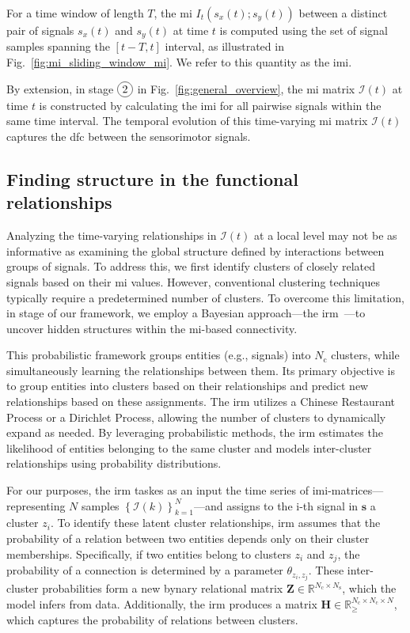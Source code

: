 For a time window of length $T$, the \ac{mi} $I_t(s_x(t);s_y(t))$ between a distinct pair of signals $s_x(t)$ and $s_y(t)$ at time $t$ is computed using the set of signal samples spanning the $\left[t-T,t\right]$ interval, as illustrated in Fig.~\ref{fig:mi_sliding_window_mi}. We refer to this quantity as the \acf{imi}. 

By extension, in stage $\circled{2}$ in Fig.~\ref{fig:general_overview}, the \ac{mi} matrix $\bm{\mathcal{I}}(t)$ at time $t$ is constructed by calculating the \ac{imi} for all pairwise signals within the same time interval. The temporal evolution of this time-varying \ac{mi} matrix $\bm{\mathcal{I}}(t)$ captures the \ac{dfc} between the sensorimotor signals.

\subsection{Finding structure in the functional relationships}\label{sec:the_irm}
Analyzing the time-varying relationships in $\bm{\mathcal{I}}(t)$ at a local level may not be as informative as examining the global structure defined by interactions between groups of signals. To address this, we first identify clusters of closely related signals based on their \ac{mi} values. However, conventional clustering techniques typically require a predetermined number of clusters. To overcome this limitation, in stage  of our framework, we employ a Bayesian approach---the \ac{irm}~\cite{Moerup2012}---to uncover hidden structures within the \ac{mi}-based connectivity.

This probabilistic framework groups entities (e.g., signals) into $N_\text{c}$ clusters, while simultaneously learning the relationships between them. Its primary objective is to group entities into clusters based on their relationships and predict new relationships based on these assignments. The \ac{irm} utilizes a Chinese Restaurant Process or a Dirichlet Process, allowing the number of clusters to dynamically expand as needed. By leveraging probabilistic methods, the \ac{irm} estimates the likelihood of entities belonging to the same cluster and models inter-cluster relationships using probability distributions.

For our purposes, the \ac{irm} taskes as an input the time series of  \ac{imi}-matrices---representing $N$ samples $\left\lbrace \bm{\mathcal{I}}(k)\right\rbrace^{N}_{k=1}$---and assigns to the i-th signal in $\bm{s}$ a cluster $z_i$. To identify these latent cluster relationships, \ac{irm} assumes that the probability of a relation between two entities depends only on their cluster memberships. Specifically, if two entities belong to clusters $z_i$ and $z_j$, the probability of a connection is determined by a parameter $\theta_{z_i,z_j}$. These inter-cluster probabilities form a new bynary relational matrix $\bm{Z}\in \mathbb{R}^{N_\text{c}\times N_\text{s}}$, which the model infers from data. Additionally, the \ac{irm} produces a matrix $\bm{H}\in \mathbb{R}^{N_\text{c}\times N_\text{c} \times N}_{\geq}$, which captures the probability of relations between clusters.

